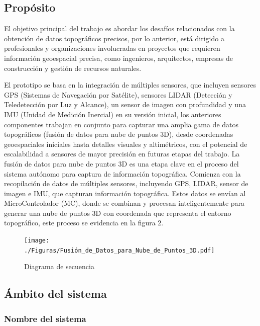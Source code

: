 \documentclass[12pt,a4paper, twoside]{article} %
\begin{document}
\newpage


\subsection{Propósito}
\label{sec:org434c3ef}

El objetivo principal del trabajo es abordar los desafíos relacionados con la obtención de datos topográficos precisos, por lo anterior, está dirigido a profesionales y organizaciones involucradas en proyectos que requieren información geoespacial precisa, como ingenieros, arquitectos, empresas de construcción y gestión de recursos naturales.

El prototipo se basa en la integración de múltiples sensores, que incluyen sensores GPS (Sistemas de Navegación por Satélite), sensores LIDAR (Detección y Teledetección por Luz y Alcance), un sensor de imagen con profundidad y una IMU (Unidad de Medición Inercial) en su versión inicial, los anteriores componentes trabajan en conjunto para capturar una amplia gama de datos topográficos (fusión de datos  para nube de puntos 3D), desde coordenadas geoespaciales iniciales hasta detalles visuales y altimétricos, con el potencial de escalabilidad a sensores de mayor precisión en futuras etapas del trabajo. La fusión de datos para nube de puntos 3D es una etapa clave en el proceso del sistema autónomo para captura de información topográfica. Comienza con la recopilación de datos de múltiples sensores, incluyendo GPS, LIDAR, sensor de imagen e IMU, que capturan información topográfica. Estos datos se envían al MicroControlador (MC), donde se combinan y procesan inteligentemente para generar una nube de puntos 3D con coordenada que representa el entorno topográfico, este proceso se   evidencia en la figura 2.

\begin{figure}[htpb]
\centering
\texttt{[image: ./Figuras/Fusión\_de\_Datos\_para\_Nube\_de\_Puntos\_3D.pdf]}
\caption{Diagrama de secuencia}
\label{fig:diagBloques}
\end{figure}




\subsection{Ámbito del sistema}
\label{sec:org12e44a1}


\subsubsection{Nombre del sistema}
\label{subsec:org12e44a2}
\end{document}
